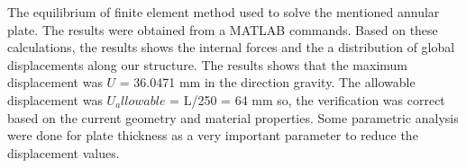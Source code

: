 The equilibrium of finite element method used to solve the mentioned annular
plate. The results were obtained from a MATLAB commands. Based on these
calculations, the results shows the internal forces and the a distribution of
global displacements along our structure. The results shows that the maximum
displacement was $U$ = 36.0471 mm in the direction gravity. The allowable
displacement was $U_allowable$ = L/250 = 64 mm so, the verification was correct
based on the current geometry and material properties. Some parametric analysis
were done for plate thickness as a very important parameter to reduce the
displacement values.

